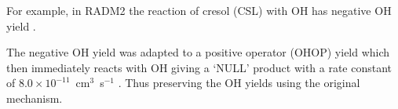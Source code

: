 For example, in RADM2 the reaction of cresol (CSL) with OH has negative OH yield .
\begin{reactionlist}
\end{reactionlist}
The negative OH yield was adapted to a positive operator (OHOP) yield  which then immediately reacts with OH giving a `NULL' product with a rate constant of \mbox{$8.0 \times 10^{-11}$ cm$^3$ s$^{-1}$} . 
Thus preserving the OH yields using the original mechanism.
\begin{reactionlist}
\end{reactionlist}
